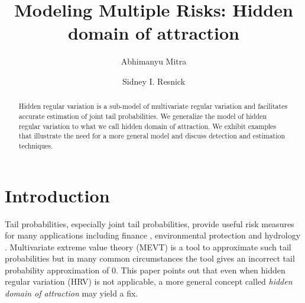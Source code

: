 \documentclass[11 pt]{amsart}
\title[Hidden domain of attraction]{Modeling Multiple Risks: Hidden domain of attraction}
\author[ A.\ Mitra ]{Abhimanyu Mitra }
\author[ S. I.\ Resnick ]{Sidney I. Resnick}
\numberwithin{equation}{section}
\begin{document}
\begin{center}
\maketitle

\end{center}
\normalsize
\vspace{-.2in}
\begin{abstract}
Hidden regular variation is a sub-model of multivariate regular
variation and facilitates accurate estimation of joint tail
probabilities. We generalize the model of hidden regular
variation to what we call hidden domain of attraction. We exhibit
examples that illustrate the need for a more general model and  discuss
detection and estimation techniques. 
\end{abstract}


\section{Introduction} \label{intro}
Tail probabilities, especially joint tail probabilities,  provide useful
{risk measures for} many  applications including finance
\citep{poon:rockinger:tawn:2003}, environmental protection
\citep{smith:2003} and hydrology \citep{dehaan:deronde:1998,
  bruun:tawn:1998}. Multivariate extreme value theory (MEVT) is
a  tool to approximate such tail probabilities but in many common
circumstances the tool gives an incorrect tail probability approximation of $0$.
This paper points out that even when hidden regular variation (HRV) is not
applicable, a more general concept called {\it hidden domain of
  attraction\/} may yield a fix.
\end{document}
